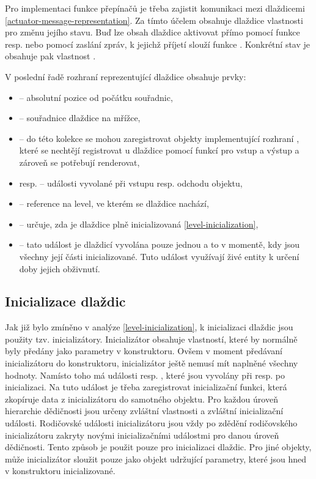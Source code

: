 
Pro implementaci funkce přepínačů je třeba zajistit komunikaci mezi dlaždicemi \vref{actuator-message-representation}.
Za tímto účelem obsahuje dlaždice vlastnosti pro změnu jejího stavu. Buď lze obsah dlaždice aktivovat přímo
pomocí funkce  resp.  nebo pomocí zaslání zpráv, k jejichž
příjetí slouží funkce . Konkrétní stav je obsahuje pak vlastnost .


V poslední řadě rozhraní reprezentující dlaždice obsahuje prvky: 
\begin{itemize}
\item {} -- absolutní pozice od počátku souřadnic,
\item {} -- souřadnice dlaždice na mřížce, 
\item {} -- do této kolekce se mohou zaregistrovat objekty implementující rozhraní , 
	které se nechtějí registrovat u dlaždice pomocí funkcí pro vstup a výstup a zároveň se potřebují renderovat, 
\item {} resp.  -- události vyvolané při vstupu resp. odchodu objektu,
\item {} -- reference na level, ve kterém se dlaždice nachází,
\item {} -- určuje, zda je dlaždice plně inicializovaná \vref{level-inicialization},
\item {} -- tato událost je dlaždicí vyvolána pouze jednou a to v momentě, kdy jsou všechny její části inicializované.
		Tuto událost využívají živé entity k určení doby jejich obživnutí.
\end{itemize}


\subsection{Inicializace dlaždic}
Jak již bylo zmíněno v analýze \vref{level-inicialization}, k inicializaci dlaždic jsou použity tzv. inicializátory. Inicializátor
obsahuje vlastností, které by normálně byly předány jako parametry v konstruktoru. Ovšem v moment předávaní
inicializátoru do konstruktoru, inicializátor ještě nemusí mít naplněné všechny hodnoty. Namísto toho má události 
resp. , které jsou vyvolány při resp. po inicializaci. Na tuto událost je třeba zaregistrovat
inicializační funkci, která zkopíruje data z inicializátoru do samotného objektu. Pro každou úroveň hierarchie
dědičnosti jsou určeny zvláštní vlastnosti a zvláštní inicializační události. Rodičovské události  inicializátoru jsou vždy
po zdědění rodičovského inicializátoru zakryty novými inicializačními událostmi pro danou úroveň dědičnosti.
Tento způsob je použit pouze pro inicializaci dlaždic. Pro jiné objekty, může inicializátor sloužit pouze jako 
objekt udržující parametry, které jsou hned v konstruktoru inicializované. 

